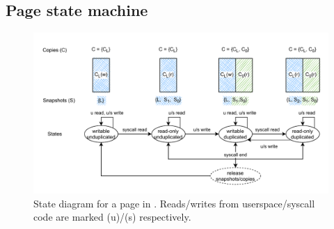 \documentclass[letterpaper,twocolumn,10pt, anonymous]{article}
\begin{document}
\subsection{Page state machine}

\begin{figure}[]
  \includegraphics[width=\linewidth]{img/tiktok_states.pdf}
  \caption{State diagram for a page in \tiktok. Reads/writes from userspace/syscall 
          code are marked (u)/(s) respectively.}
  \label{fig:tiktok_states}
\end{figure}
\end{document}
